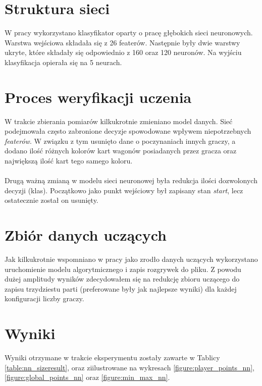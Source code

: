 \documentclass[12pt, oneside]{report}
\begin{document}
\section{Struktura sieci}
W pracy wykorzystano klasyfikator oparty o pracę głębokich sieci neuronowych. Warstwa wejściowa składała się z 26 featerów. Następnie były dwie warstwy ukryte, które składały się odpowiednio z 160 oraz 120 neuronów. Na wyjściu klasyfikacja opierała się na 5 neurach.
\section{Proces weryfikacji uczenia}
W trakcie zbierania pomiarów kilkukrotnie zmieniano model danych. Sieć podejmowała często zabronione decyzje spowodowane wpływem niepotrzebnych \textit{featerów}. W związku z tym usunięto dane o poczynaniach innych graczy, a dodano ilość różnych kolorów kart wagonów posiadanych przez gracza oraz największą ilość kart tego samego koloru. \\ \\ 
Drugą ważną zmianą w modelu sieci neuronowej była redukcja ilości dozwolonych decyzji (klas). Początkowo jako punkt wejściowy był zapisany stan \textit{start}, lecz ostatecznie został on usunięty.
\section{Zbiór danych uczących}
Jak kilkukrotnie wspomniano w pracy jako zrodło danych uczących wykorzystano uruchomienie modelu algorytmicznego i zapis rozgrywek do pliku. Z powodu dużej amplitudy wyników zdecydowałem się na redukcję zbioru uczącego do zapisu trzydziestu parti (preferowane były jak najlepsze wyniki) dla każdej konfiguracji liczby graczy. 
\section{Wyniki} 
Wyniki otrzymane w trakcie eksperymentu zostały zawarte w Tablicy \ref{table:nn_sizeresult}, oraz ziilustrowane na wykresach \ref{figure:player_points_nn}, \ref{figure:global_points_nn} oraz \ref{figure:min_max_nn}.
\end{document}
